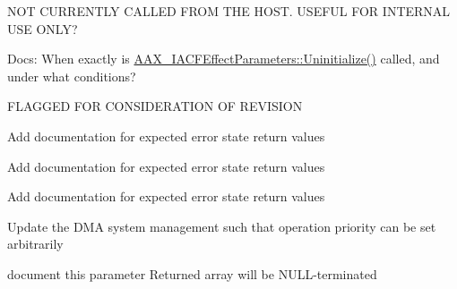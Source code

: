 \begin{DoxyRefList}
\label{a00800__todo000040}%
%
NOT CURRENTLY CALLED FROM THE HOST. USEFUL FOR INTERNAL USE ONLY? 
\item[Member \mbox{\hyperlink{a01953_a711969adc95624fb9ac8a3e3b2c23696}{AAX\+\_\+\+IACFEffect\+Parameters\+::Uninitialize}} ()=0]\label{a00800__todo000035}%
%
Docs\+: When exactly is \mbox{\hyperlink{a01953_a711969adc95624fb9ac8a3e3b2c23696}{AAX\+\_\+\+IACFEffect\+Parameters\+::\+Uninitialize()}} called, and under what conditions? 
\item[Member \mbox{\hyperlink{a01953_a685858711efb8634ce66c327f2865c71}{AAX\+\_\+\+IACFEffect\+Parameters\+::Update\+Parameter\+Normalized\+Value}} (AAX\+\_\+\+CParam\+ID i\+Parameter\+ID, double i\+Value, AAX\+\_\+\+EUpdate\+Source i\+Source)=0]\label{a00800__todo000041}%
%
FLAGGED FOR CONSIDERATION OF REVISION 
\item[Class \mbox{\hyperlink{a01961}{AAX\+\_\+\+IACFEffect\+Parameters\+\_\+\+V2}} ]\label{a00800__todo000032}%
%
Add documentation for expected error state return values 
\item[Class \mbox{\hyperlink{a01965}{AAX\+\_\+\+IACFEffect\+Parameters\+\_\+\+V3}} ]\label{a00800__todo000033}%
%
Add documentation for expected error state return values 
\item[Class \mbox{\hyperlink{a01969}{AAX\+\_\+\+IACFEffect\+Parameters\+\_\+\+V4}} ]\label{a00800__todo000034}%
%
Add documentation for expected error state return values 
\item[Member \mbox{\hyperlink{a02069_aff9e1c726bbdf500f2d61b164589744e}{AAX\+\_\+\+IComponent\+Descriptor\+::Add\+Dma\+Instance}} (AAX\+\_\+\+CField\+Index in\+Field\+Index, \mbox{\hyperlink{a02097_af8d0f19f2896dd6dbd126b919b24e39b}{AAX\+\_\+\+IDma\+::\+EMode}} in\+Dma\+Mode)=0]\label{a00800__todo000042}%
%
Update the DMA system management such that operation priority can be set arbitrarily 
\item[Member \mbox{\hyperlink{a02069_a0e8f6217d0f317c728b3e30f15f181d2}{AAX\+\_\+\+IComponent\+Descriptor\+::Add\+Process\+Proc}} (\mbox{\hyperlink{a02157}{AAX\+\_\+\+IProperty\+Map}} $\ast$in\+Properties, AAX\+\_\+\+CSelector $\ast$out\+Proc\+IDs=NULL, int32\+\_\+t in\+Proc\+IDs\+Size=0)=0]\label{a00800__todo000045}%
%
document this parameter Returned array will be NULL-\/terminated 
\item[Member \mbox{\hyperlink{a02069_a1c069508cf54a523905c8160ebf628ad}{AAX\+\_\+\+IComponent\+Descriptor\+::Add\+Process\+Proc\+\_\+\+Native}} (AAX\+\_\+\+CProcess\+Proc in\+Process\+Proc, \mbox{\hyperlink{a02157}{AAX\+\_\+\+IProperty\+Map}} $\ast$in\+Properties=NULL, AAX\+\_\+\+CInstance\+Init\+Proc in\+Instance\+Init\+Proc=NULL, AAX\+\_\+\+CBackground\+Proc in\+Background\+Proc=NULL, AAX\+\_\+\+CSelector $\ast$out\+Proc\+ID=NULL)=0]\label{a00800__todo000043}%

\end{DoxyRefList}
